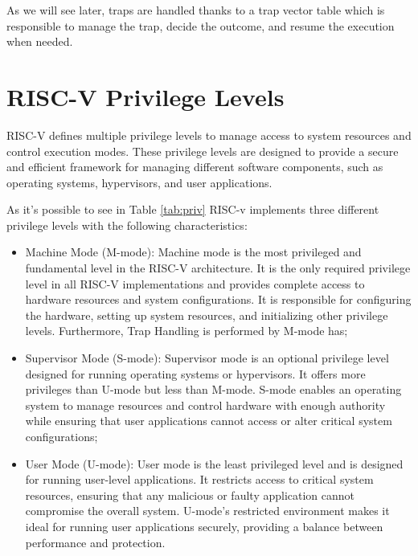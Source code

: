 As we will see later, traps are handled thanks to a trap vector table which is responsible
to manage the trap, decide the outcome, and resume the execution when needed.

\section{RISC-V Privilege Levels}
\label{sec:riscv_privileges}

RISC-V defines multiple privilege levels to manage access to system resources
and control execution modes. These privilege levels are designed to provide a secure
and efficient framework for managing different software components, such as
operating systems, hypervisors, and user applications.

As it's possible to see in Table \ref{tab:priv} RISC-v implements three
different privilege levels with the following characteristics:

\begin{itemize}
  \item Machine Mode (M-mode): Machine mode is the most privileged and
    fundamental level in the RISC-V architecture. It is the only required privilege
    level in all RISC-V implementations and provides complete access to hardware
    resources and system configurations. It is responsible for configuring the
    hardware, setting up system resources, and initializing other privilege
    levels. Furthermore, Trap Handling is performed by M-mode has;

  \item Supervisor Mode (S-mode): Supervisor mode is an optional privilege level
    designed for running operating systems or hypervisors. It offers more privileges
    than U-mode but less than M-mode. S-mode enables an operating system to
    manage resources and control hardware with enough authority while ensuring
    that user applications cannot access or alter critical system configurations;

  \item User Mode (U-mode): User mode is the least privileged level and is
    designed for running user-level applications. It restricts access to critical
    system resources, ensuring that any malicious or faulty application cannot
    compromise the overall system. U-mode’s restricted environment makes it ideal
    for running user applications securely, providing a balance between
    performance and protection.
\end{itemize}

